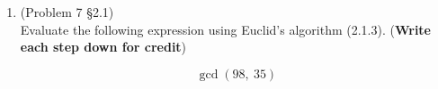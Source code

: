 \documentclass[12pt]{exam}
\begin{document}
\begin{enumerate}

    \item (Problem 7 \S 2.1)\\
    Evaluate the following expression using Euclid's algorithm (2.1.3). (\textbf{Write each step down for credit})

    \[\gcd(98,\ 35)\]

    \begin{solutionorbox}[2in] \\ \\ \\ \\ \\ \\ \\ \\ \\ \\ \\ \\  
    \end{solutionorbox}

    \end{enumerate}
\end{document}
